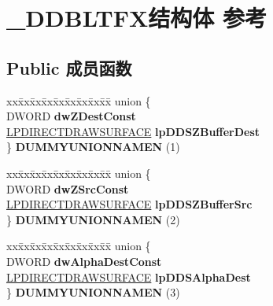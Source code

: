\hypertarget{struct___d_d_b_l_t_f_x}{}\section{\+\_\+\+D\+D\+B\+L\+T\+F\+X结构体 参考}
\label{struct___d_d_b_l_t_f_x}
\subsection*{Public 成员函数}
\begin{DoxyCompactItemize}
\item 
\mbox{\label{struct___d_d_b_l_t_f_x_a8057c6b37e86a3477c5161fa8b2f6041}} 
\begin{tabbing}
xx\=xx\=xx\=xx\=xx\=xx\=xx\=xx\=xx\=\kill
union \{\\
\>DWORD {\bfseries dwZDestConst}\\
\>\hyperlink{interfacevoid}{LPDIRECTDRAWSURFACE} {\bfseries lpDDSZBufferDest}\\
\} {\bfseries DUMMYUNIONNAMEN} (1)\\

\end{tabbing}\item 
\mbox{\label{struct___d_d_b_l_t_f_x_a84f0c3b923c20162de7132e8d08a7428}} 
\begin{tabbing}
xx\=xx\=xx\=xx\=xx\=xx\=xx\=xx\=xx\=\kill
union \{\\
\>DWORD {\bfseries dwZSrcConst}\\
\>\hyperlink{interfacevoid}{LPDIRECTDRAWSURFACE} {\bfseries lpDDSZBufferSrc}\\
\} {\bfseries DUMMYUNIONNAMEN} (2)\\

\end{tabbing}\item 
\mbox{\label{struct___d_d_b_l_t_f_x_a6640ca88b94ab04d7cfbaebb99b84a95}} 
\begin{tabbing}
xx\=xx\=xx\=xx\=xx\=xx\=xx\=xx\=xx\=\kill
union \{\\
\>DWORD {\bfseries dwAlphaDestConst}\\
\>\hyperlink{interfacevoid}{LPDIRECTDRAWSURFACE} {\bfseries lpDDSAlphaDest}\\
\} {\bfseries DUMMYUNIONNAMEN} (3)\\


\end{tabbing}
\end{DoxyCompactItemize}
